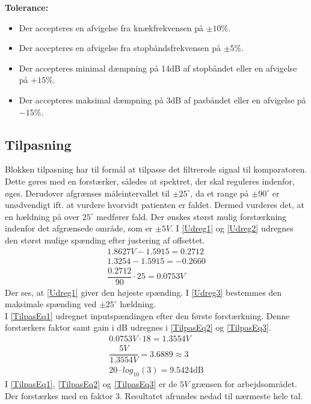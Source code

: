 \textbf{Tolerance:}
\begin{itemize}
	\item Der accepteres en afvigelse fra knækfrekvensen på $\pm10\%$.
	\item Der accepteres en afvigelse fra stopbåndsfrekvensen på $\pm5\%$.
	\item Der accepteres minimal dæmpning på 14dB af stopbåndet eller en afvigelse på $+15\%$.
	\item Der accepteres maksimal dæmpning på 3dB af pasbåndet eller en afvigelse på $-15\%$.
\end{itemize}
\subsection{Tilpasning}\label{Tilpasningsblok}
Blokken tilpasning har til formål at tilpasse det filtrerede signal til komparatoren. Dette gøres med en forstærker, således at spektret, der skal reguleres indenfor, øges. Derudover afgrænses måleintervallet til $\pm25^{\circ}$, da et range på $\pm90^{\circ}$ er unødvendigt ift. at vurdere hvorvidt patienten er faldet. Dermed vurderes det, at en hældning på over $25^{\circ}$ medfører fald. Der ønskes størst mulig forstærkning indenfor det afgrænsede område, som er $\pm5V$. I \eqref{Udreg1} og \eqref{Udreg2} udregnes den størst mulige spænding efter justering af offsettet. 
\begin{align}
\label{Udreg1} 1.8627V - 1.5915 = 0.2712 \\
\label{Udreg2} 1.3254 - 1.5915 = -0.2660 \\
\label{Udreg3} \dfrac{0.2712}{90} \cdot 25 = 0.0753V
\end{align}
Der ses, at \eqref{Udreg1} giver den højeste spænding. I \eqref{Udreg3} bestemmes den maksimale spænding ved $\pm25^{\circ}$ hældning. \\
I \eqref{TilpasEq1} udregnet inputspændingen efter den første forstærkning. Denne forstærkers faktor samt gain i dB udregnes i \eqref{TilpasEq2} og \eqref{TilpasEq3}.
\begin{align}
\label{TilpasEq1} 0.0753V \cdot 18 = 1.3554V \\
\label{TilpasEq2} \dfrac{5V}{1.3554V} = 3.6889 \approx 3 \\
\label{TilpasEq3} 20 \cdot log_{10} (3) = 9.5424\text{dB}
\end{align} 
I \eqref{TilpasEq1}, \eqref{TilpasEq2} og \eqref{TilpasEq3} er de $5V$ grænsen for arbejdsområdet. Der forstærkes med en faktor 3. Resultatet afrundes nedad til nærmeste hele tal. \\

